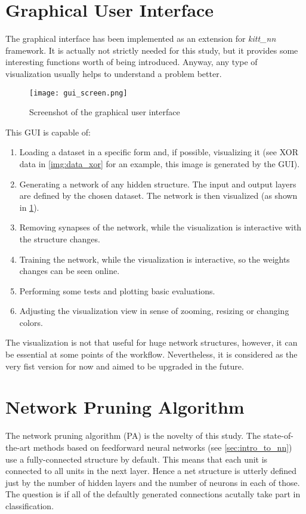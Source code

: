 \section{Graphical User Interface} \label{sec:gui}
The graphical interface has been implemented as an extension for \textit{kitt\_nn} framework. It is actually not strictly needed for this study, but it provides some interesting functions worth of being introduced. Anyway, any type of visualization usually helps to understand a problem better.

\begin{figure}[H]
  \centering
  \texttt{[image: gui\_screen.png]}
  \caption{Screenshot of the graphical user interface}
  \label{img:gui_screen}
\end{figure}

This GUI is capable of:
\begin{enumerate}
\item Loading a dataset in a specific form and, if possible, visualizing it (see XOR data in \cref{img:data_xor} for an example, this image is generated by the GUI).
\item Generating a network of any hidden structure. The input and output layers are defined by the chosen dataset. The network is then visualized (as shown in \cref{img:gui_screen}).
\item Removing synapses of the network, while the visualization is interactive with the structure changes.
\item Training the network, while the visualization is interactive, so the weights changes can be seen online.
\item Performing some tests and plotting basic evaluations.
\item Adjusting the visualization view in sense of zooming, resizing or changing colors.
\end{enumerate}

The visualization is not that useful for huge network structures, however, it can be essential at some points of the workflow. Nevertheless, it is considered as the very fist version for now and aimed to be upgraded in the future.

\newpage
\section{Network Pruning Algorithm} \label{sec:network_pruning_algorithm}
The network pruning algorithm (PA) is the novelty of this study. The state-of-the-art methods based on feedforward neural networks (see \cref{sec:intro_to_nn}) use a fully-connected structure by default. This means that each unit is connected to all units in the next layer. Hence a net structure is utterly defined just by the number of hidden layers and the number of neurons in each of those. The question is if all of the defaultly generated connections acutally take part in classification.

